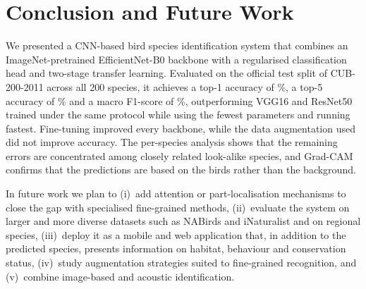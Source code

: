 \documentclass[conference]{IEEEtran}
\begin{document}
\section{Conclusion and Future Work}\label{sec:conclusion}
We presented a CNN-based bird species identification system that combines an
ImageNet-pretrained EfficientNet-B0 backbone with a regularised classification
head and two-stage transfer learning. Evaluated on the official test split of
CUB-200-2011 across all 200 species, it achieves a top-1 accuracy of
\EffNetTopOne\%, a top-5 accuracy of \EffNetTopFive\% and a macro F1-score of
\EffNetMacroF\%, outperforming VGG16 and ResNet50 trained under the same protocol
while using the fewest parameters and running fastest. Fine-tuning improved every
backbone, while the data augmentation used did not improve accuracy. The per-species
analysis shows that the remaining errors are concentrated among closely related
look-alike species, and Grad-CAM confirms that the predictions are based on the
birds rather than the background.

In future work we plan to (i)~add attention or part-localisation mechanisms to
close the gap with specialised fine-grained methods, (ii)~evaluate the system on
larger and more diverse datasets such as NABirds and iNaturalist and on regional
species, (iii)~deploy it as a mobile and web application that, in addition to the
predicted species, presents information on habitat, behaviour and conservation
status, (iv)~study augmentation strategies suited to fine-grained recognition, and
(v)~combine image-based and acoustic identification.

\FloatBarrier
\end{document}
